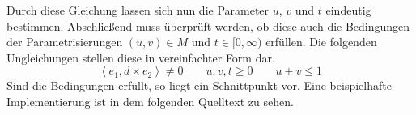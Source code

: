 \documentclass[crop=false]{standalone}
\begin{document}
      Durch diese Gleichung lassen sich nun die Parameter $u$, $v$ und $t$ eindeutig bestimmen.
      Abschließend muss überprüft werden, ob diese auch die Bedingungen der Parametrisierungen $(u,v)\in M$ und $t\in [0,\infty)$ erfüllen.
      Die folgenden Ungleichungen stellen diese in vereinfachter Form dar.
      \[
        \left\langle e_1, d\times e_2  \right\rangle \neq 0
        \qquad
        u,v,t \geq 0
        \qquad
        u+v\leq 1
      \]
      Sind die Bedingungen erfüllt, so liegt ein Schnittpunkt vor.
      Eine beispielhafte Implementierung ist in dem folgenden Quelltext zu sehen.

\end{document}
